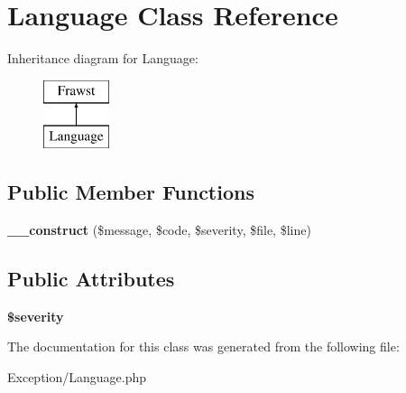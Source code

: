\hypertarget{classLanguage}{
\section{Language Class Reference}
\label{classLanguage}
}
Inheritance diagram for Language:\begin{figure}[H]
\begin{center}
\leavevmode
\includegraphics[height=2.000000cm]{classLanguage}
\end{center}
\end{figure}
\subsection*{Public Member Functions}
\begin{DoxyCompactItemize}
\item 
\hypertarget{classLanguage_aef959d5bc3a037220968ede228e9c8aa}{
{\bfseries \_\-\_\-construct} (\$message, \$code, \$severity, \$file, \$line)}
\label{classLanguage_aef959d5bc3a037220968ede228e9c8aa}

\end{DoxyCompactItemize}
\subsection*{Public Attributes}
\begin{DoxyCompactItemize}
\item 
\hypertarget{classLanguage_a2c142670d03c9e998b1223638fbbba3d}{
{\bfseries \$severity}}
\label{classLanguage_a2c142670d03c9e998b1223638fbbba3d}

\end{DoxyCompactItemize}


The documentation for this class was generated from the following file:\begin{DoxyCompactItemize}
\item 
Exception/Language.php\end{DoxyCompactItemize}
